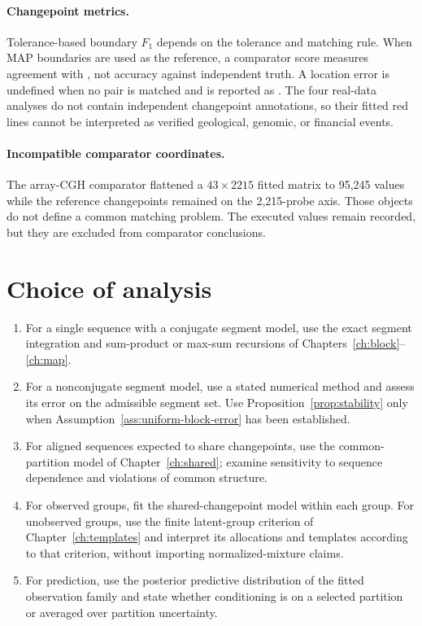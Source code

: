 \paragraph{Changepoint metrics.}
Tolerance-based boundary $F_1$ depends on the tolerance and matching rule. When \BayesBreak MAP
boundaries are used as the reference, a comparator score measures agreement with \BayesBreak, not
accuracy against independent truth. A location error is undefined when no pair is matched and is
reported as \NA. The four real-data analyses do not contain independent changepoint annotations,
so their fitted red lines cannot be interpreted as verified geological, genomic, or financial
events.

\paragraph{Incompatible comparator coordinates.}
The array-CGH comparator flattened a $43\times2215$ fitted matrix to 95,245 values while the
reference changepoints remained on the 2,215-probe axis. Those objects do not define a common
matching problem. The executed values remain recorded, but they are excluded from comparator
conclusions.

\section{Choice of analysis}
\begin{enumerate}[label=(\arabic*),leftmargin=2.3em]
\item For a single sequence with a conjugate segment model, use the exact segment integration and
sum-product or max-sum recursions of Chapters~\ref{ch:block}--\ref{ch:map}.
\item For a nonconjugate segment model, use a stated numerical method and assess its error on the
admissible segment set. Use Proposition~\ref{prop:stability} only when
Assumption~\ref{ass:uniform-block-error} has been established.
\item For aligned sequences expected to share changepoints, use the common-partition model of
Chapter~\ref{ch:shared}; examine sensitivity to sequence dependence and violations of common
structure.
\item For observed groups, fit the shared-changepoint model within each group. For unobserved
groups, use the finite latent-group criterion of Chapter~\ref{ch:templates} and interpret its
allocations and templates according to that criterion, without importing normalized-mixture
claims.
\item For prediction, use the posterior predictive distribution of the fitted observation family
and state whether conditioning is on a selected partition or averaged over partition uncertainty.
\end{enumerate}

